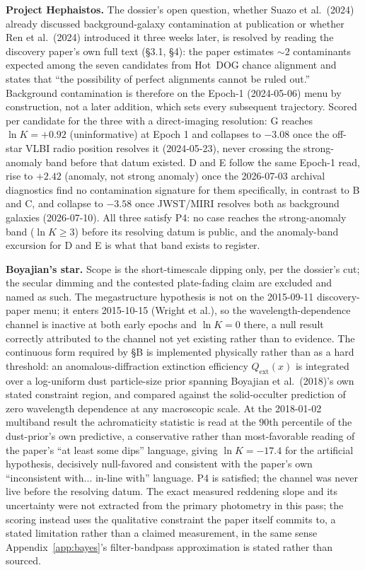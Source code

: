\documentclass[11pt]{article}
\newcommand{\lnK}{\ensuremath{\ln K}}
\begin{document}
\textbf{Project Hephaistos.} The dossier's open question, whether Suazo et al.\ (2024) already discussed background-galaxy contamination at publication or whether Ren et al.\ (2024) introduced it three weeks later, is resolved by reading the discovery paper's own full text (\S3.1, \S4): the paper estimates $\sim 2$ contaminants expected among the seven candidates from Hot~DOG chance alignment and states that ``the possibility of perfect alignments cannot be ruled out.'' Background contamination is therefore on the Epoch-1 (2024-05-06) menu by construction, not a later addition, which sets every subsequent trajectory. Scored per candidate for the three with a direct-imaging resolution: G reaches $\lnK = +0.92$ (uninformative) at Epoch 1 and collapses to $-3.08$ once the off-star VLBI radio position resolves it (2024-05-23), never crossing the strong-anomaly band before that datum existed. D and E follow the same Epoch-1 read, rise to $+2.42$ (anomaly, not strong anomaly) once the 2026-07-03 archival diagnostics find no contamination signature for them specifically, in contrast to B and C, and collapse to $-3.58$ once JWST/MIRI resolves both as background galaxies (2026-07-10). All three satisfy P4: no case reaches the strong-anomaly band ($\lnK \geq 3$) before its resolving datum is public, and the anomaly-band excursion for D and E is what that band exists to register.

\textbf{Boyajian's star.} Scope is the short-timescale dipping only, per the dossier's cut; the secular dimming and the contested plate-fading claim are excluded and named as such. The megastructure hypothesis is not on the 2015-09-11 discovery-paper menu; it enters 2015-10-15 (Wright et al.), so the wavelength-dependence channel is inactive at both early epochs and $\lnK = 0$ there, a null result correctly attributed to the channel not yet existing rather than to evidence. The continuous form required by \S B is implemented physically rather than as a hard threshold: an anomalous-diffraction extinction efficiency $Q_{\mathrm{ext}}(x)$ is integrated over a log-uniform dust particle-size prior spanning Boyajian et al.\ (2018)'s own stated constraint region, and compared against the solid-occulter prediction of zero wavelength dependence at any macroscopic scale. At the 2018-01-02 multiband result the achromaticity statistic is read at the $90$th percentile of the dust-prior's own predictive, a conservative rather than most-favorable reading of the paper's ``at least some dips'' language, giving $\lnK = -17.4$ for the artificial hypothesis, decisively null-favored and consistent with the paper's own ``inconsistent with... in-line with'' language. P4 is satisfied; the channel was never live before the resolving datum. The exact measured reddening slope and its uncertainty were not extracted from the primary photometry in this pass; the scoring instead uses the qualitative constraint the paper itself commits to, a stated limitation rather than a claimed measurement, in the same sense Appendix~\ref{app:bayes}'s filter-bandpass approximation is stated rather than sourced.
\end{document}
